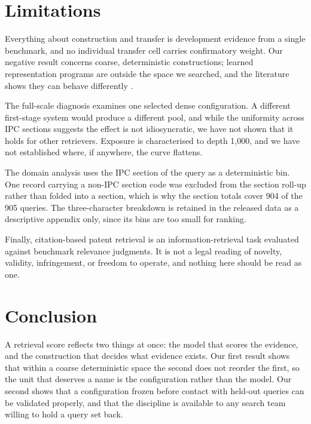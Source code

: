 \documentclass[preprint,11pt,authoryear]{elsarticle}
\begin{document}
\section{Limitations}
\label{sec:limitations}

Everything about construction and transfer is development evidence from a single benchmark, and no individual transfer cell carries confirmatory weight. Our negative result concerns coarse, deterministic constructions; learned representation programs are outside the space we searched, and the literature shows they can behave differently \citep{onuallain2026autoindex}.

The full-scale diagnosis examines one selected dense configuration. A different first-stage system would produce a different pool, and while the uniformity across IPC sections suggests the effect is not idiosyncratic, we have not shown that it holds for other retrievers. Exposure is characterised to depth 1{,}000, and we have not established where, if anywhere, the curve flattens.

The domain analysis uses the IPC section of the query as a deterministic bin. One record carrying a non-IPC section code was excluded from the section roll-up rather than folded into a section, which is why the section totals cover 904 of the 905 queries. The three-character breakdown is retained in the released data as a descriptive appendix only, since its bins are too small for ranking.

Finally, citation-based patent retrieval is an information-retrieval task evaluated against benchmark relevance judgments. It is not a legal reading of novelty, validity, infringement, or freedom to operate, and nothing here should be read as one.

\section{Conclusion}

A retrieval score reflects two things at once: the model that scores the evidence, and the construction that decides what evidence exists. Our first result shows that within a coarse deterministic space the second does not reorder the first, so the unit that deserves a name is the configuration rather than the model. Our second shows that a configuration frozen before contact with held-out queries can be validated properly, and that the discipline is available to any search team willing to hold a query set back.
\end{document}
